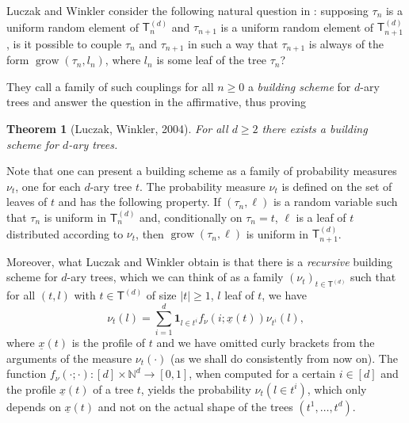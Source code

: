 \documentclass[11pt]{article}
\renewcommand{\geq}{\geqslant}
\newcommand{\sT}{\mathsf{T}} %
\newcommand{\grow}{\operatorname{grow}}
\newtheorem{thm}{Theorem}[section]
\begin{document}
Luczak and Winkler consider the following natural question in \cite{LW04}: supposing $\tau_n$ is a uniform random element of $\sT^{(d)}_n$ and $\tau_{n+1}$ is a uniform random element of $\sT^{(d)}_{n+1}$, is it possible to couple $\tau_n$ and $\tau_{n+1}$ in such a way that $\tau_{n+1}$ is always of the form $\grow(\tau_n,l_n)$, where $l_n$ is some leaf of the tree $\tau_n$? 

They call a family of such couplings for all $n\geq 0$ a \emph{building scheme} for $d$-ary trees and answer the question in the affirmative, thus proving

\begin{thm}[Luczak, Winkler, 2004]\label{thm:building scheme existence}For all $d\geq 2$ there exists a building scheme for $d$-ary trees.
\end{thm}

Note that one can present a building scheme as a family of probability measures $\nu_t$, one for each $d$-ary tree $t$. The probability measure $\nu_t$ is defined on the set of leaves of $t$ and has the following property. If $(\tau_n,\ell)$ is a random variable such that $\tau_n$ is uniform in $\sT_n^{(d)}$ and, conditionally on $\tau_n=t$, $\ell$ is a leaf of $t$ distributed according to $\nu_t$, then $\grow(\tau_n, \ell)$ is uniform in $\sT^{(d)}_{n+1}$. 

Moreover, what Luczak and Winkler obtain is that there is a \emph{recursive} building scheme for $d$-ary trees, which we can think of as a family $(\nu_t)_{t\in \sT^{(d)}}$ such that for all $(t,l)$ with $t\in \sT^{(d)}$ of size $|t|\geq 1$, $l$ leaf of $t$, we have
$$\nu_t(l)=\sum_{i=1}^d \mathbf{1}_{l\in t^i}f_\nu(i;\underline{x}(t))\nu_{t^i}(l),$$
where $\underline{x}(t)$ is the profile of $t$ and we have omitted curly brackets from the arguments of the measure $\nu_t(\cdot)$ (as we shall do consistently from now on). The function $f_\nu(\cdot ;\cdot ):[d]\times \mathbb{N}^d\to [0,1]$, when computed for a certain $i\in[d]$ and the profile $\underline{x}(t)$ of a tree $t$, yields the probability $\nu_t(l\in t^i)$, which only depends on $\underline{x}(t)$ and not on the actual shape of the trees $(t^1,\ldots,t^d)$.
\end{document}
